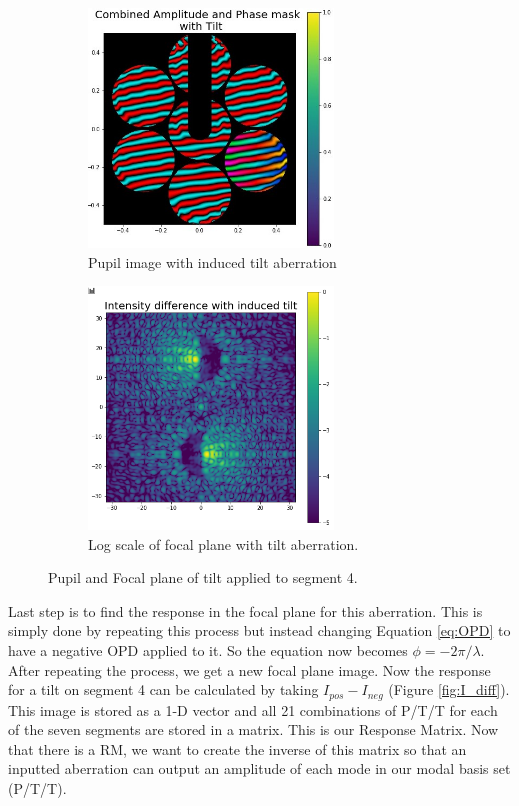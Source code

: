 \begin{figure}[H]
\centering
\begin{subfigure}{.5\textwidth}
  \centering
  \includegraphics[width=6.5cm]{Figures/tilt_comb.jpg}
  \caption{Pupil image with induced tilt aberration}
  \label{fig:tilt_pupil}
\end{subfigure}%
\begin{subfigure}{.5\textwidth}
  \centering
  \includegraphics[width=6.5cm]{Figures/PSF_tilt.png}
  \caption{Log scale of focal plane with tilt aberration.}
  \label{fig:tilt_focal}
\end{subfigure}
\caption{Pupil and Focal plane of tilt applied to segment 4.}
\label{fig:abb_images}
\end{figure}

Last step is to find the response in the focal plane for this aberration.  This is simply done by repeating this
process but instead changing Equation \ref{eq:OPD} to have a negative OPD applied to it.  So the equation now
becomes $\phi = -2 \pi / \lambda$.  After repeating the process, we get a new focal plane image.  Now the response
for a tilt on segment 4 can be calculated by taking $I_{pos} - I_{neg}$ (Figure \ref{fig:I_diff}).  This image is
stored as a 1-D vector and all 21 combinations of P/T/T for each of the seven segments are stored in a matrix.  This
is our Response Matrix.  Now that there is a RM, we want to create the inverse of this matrix so that an inputted
aberration can output an amplitude of each mode in our modal basis set (P/T/T).


